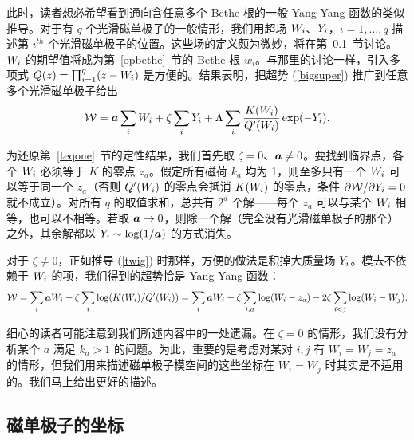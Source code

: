 此时，读者想必希望看到通向含任意多个 Bethe 根的一般 Yang-Yang 函数的类似推导。对于有 $q$ 个光滑磁单极子的一般情形，我们用超场 ${ W}_i$、${ Y}_i$，$i=1,\dots,q$ 描述第 $i^{th}$ 个光滑磁单极子的位置。这些场的定义颇为微妙，将在第~\ref{scattering}~节讨论。${ W}_i$ 的期望值将成为第~\ref{opbethe}~节的 Bethe 根 $w_i$。与那里的讨论一样，引入多项式 $Q(z)=\prod_{i=1}^q(z-{ W}_i)$ 是方便的。结果表明，把超势 (\ref{bigsuper}) 推广到任意多个光滑磁单极子给出
\begin{equation}\label{giantsuper}{\mathcal W}={\boldsymbol{a}}\sum_i { W}_i +\zeta\sum_i { Y}_i+\Lambda
\sum_i \frac{K(W_i)}{Q'(W_i)}\exp(-Y_i).   \end{equation}

为还原第~\ref{teqone}~节的定性结果，我们首先取 $\zeta=0$、${\boldsymbol{a}}\not=0$。要找到临界点，各个 ${ W}_i$ 必须等于 $K$ 的零点 $z_a$。假定所有磁荷 $k_a$ 均为 1，则至多只有一个 ${ W}_i$ 可以等于同一个 $z_a$（否则 $Q'({ W}_i)$ 的零点会抵消 $K({ W}_i)$ 的零点，条件 $\partial{\mathcal W}/\partial { Y}_i=0$ 就不成立）。对所有 $q$ 的取值求和，总共有 $2^d$ 个解——每个 $z_a$ 可以与某个 ${ W}_i$ 相等，也可以不相等。若取 ${\boldsymbol{a}}\to 0$，则除一个解（完全没有光滑磁单极子的那个）之外，其余解都以 ${ Y}_i\sim \log(1/{\boldsymbol{a}})$ 的方式消失。

对于 $\zeta\not=0$，正如推导 (\ref{twig}) 时那样，方便的做法是积掉大质量场 ${ Y}_i$。模去不依赖于 ${ W}_i$ 的项，我们得到的超势恰是 Yang-Yang 函数：
\begin{equation}\label{longyang} {\mathcal W}=\sum_i{\boldsymbol{a}}{ W}_i+\zeta\sum_i\log(K({ W}_i)/Q'({ W}_i))
=\sum_i{\boldsymbol{a}}{ W}_i+\zeta\sum_{i,a}\log({ W}_i-z_a)-2\zeta\sum_{i<j}\log({ W}_i-{ W}_j).\end{equation}

细心的读者可能注意到我们所述内容中的一处遗漏。在 $\zeta=0$ 的情形，我们没有分析某个 $a$ 满足 $k_a>1$ 的问题。为此，重要的是考虑对某对 $i,j$ 有 $W_i=W_j=z_a$ 的情形，但我们用来描述磁单极子模空间的这些坐标在 $W_i=W_j$ 时其实是不适用的。我们马上给出更好的描述。


\subsection{磁单极子的坐标}\label{scattering}

